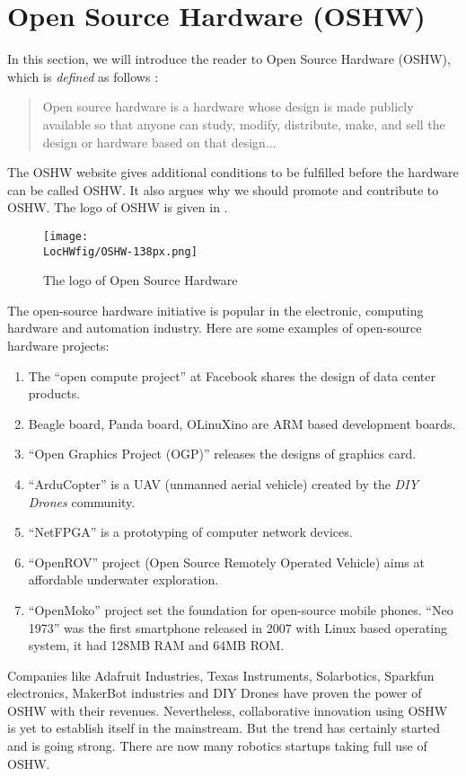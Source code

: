 \section{Open Source Hardware (OSHW)}
\label{sec:oshw}
In this section, we will introduce the reader to Open Source Hardware
(OSHW), which is 
\emph{defined} as follows \cite{oshw-ref}:
\begin{quote}
Open source hardware is a hardware whose design is made publicly
available so that anyone can study, modify, distribute, make, and sell
the design or hardware based on that design...
\end{quote}
The OSHW website \cite{oshw-ref} gives additional conditions to be
fulfilled before the hardware can be called OSHW.  It also argues why
we should promote and contribute to OSHW.  The logo of OSHW is given
in  \cite{OSHW-logo-ref}.
\begin{figure}
\centering
\texttt{[image: \\LocHWfig/OSHW-138px.png]}
\caption{The logo of Open Source Hardware}
\label{fig:OSHW-logo}
\end{figure}
The open-source hardware initiative is popular in the electronic,
computing hardware and automation industry.  Here are some examples of
open-source hardware projects:
\begin{enumerate}
\item The ``open compute project'' at Facebook shares the design of
  data center products.
\item Beagle board, Panda board, OLinuXino are ARM based development
  boards.
\item ``Open Graphics Project (OGP)'' releases the designs of
  graphics card.
\item ``ArduCopter'' is a UAV (unmanned aerial vehicle) created by
  the \emph{DIY Drones} community.
\item ``NetFPGA'' is a prototyping of computer network devices.
\item ``OpenROV'' project (Open Source Remotely Operated Vehicle)
  aims at affordable underwater exploration.
\item ``OpenMoko'' project set the foundation for open-source mobile
  phones. ``Neo 1973'' was the first smartphone released in 2007
  with Linux based operating system, it had 128MB RAM and 64MB ROM.
\end{enumerate}

Companies like Adafruit Industries, Texas Instruments, Solarbotics,
Sparkfun electronics, MakerBot industries and DIY Drones have proven
the power of OSHW with their revenues.  Nevertheless, collaborative
innovation using OSHW is yet to establish itself in the mainstream.  But
the trend has certainly started and is going strong.  There are now
many robotics startups taking full use of OSHW.

